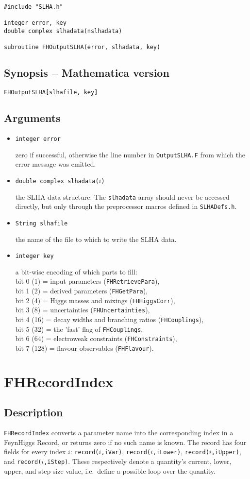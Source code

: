 \documentclass[12pt,a4paper]{report}
\newcommand{\CODE}[1]{\texttt{#1}}
\newcommand{\VARIN}[1]{%
  \item[\fbox{\scriptsize\textsc{in}}]
  \CODE{#1}\par}
\newcommand{\VAROUT}[1]{%
  \item[\fbox{\scriptsize\textsc{out}}]
  \CODE{#1}\par}
\newcommand{\ROUTINE}[1]{\pagebreak
  \section*{#1}%
  \addcontentsline{toc}{section}{#1}}
\newcommand{\DESCRIPTION}{\subsection*{Description}}
\newcommand{\MSYNOPSIS}{\subsection*{Synopsis -- Mathematica version}}
\newcommand{\ARGUMENTS}{\subsection*{Arguments}\begin{itemize}}
\newcommand{\ENDARGUMENTS}{\end{itemize}}
\newcommand\ie{i.e.\ }
\begin{document}
\begin{verbatim}
#include "SLHA.h"

integer error, key
double complex slhadata(nslhadata)

subroutine FHOutputSLHA(error, slhadata, key)
\end{verbatim}

\MSYNOPSIS

\begin{verbatim}
FHOutputSLHA[slhafile, key]
\end{verbatim}

\ARGUMENTS

\VAROUT{integer error}
zero if successful, otherwise the line number in \CODE{OutputSLHA.F} 
from which the error message was emitted.

\VARIN{double complex slhadata($i$)}
the SLHA data structure.  The \CODE{slhadata} array should never be
accessed directly, but only through the preprocessor macros defined in 
\CODE{SLHADefs.h}.

\VARIN{String slhafile}
the name of the file to which to write the SLHA data.

\VARIN{integer key}
a bit-wise encoding of which parts to fill: \\
bit 0 (1) = input parameters (\CODE{FHRetrievePara}), \\
bit 1 (2) = derived parameters (\CODE{FHGetPara}), \\
bit 2 (4) = Higgs masses and mixings (\CODE{FHHiggsCorr}), \\
bit 3 (8) = uncertainties (\CODE{FHUncertainties}), \\
bit 4 (16) = decay widths and branching ratios (\CODE{FHCouplings}), \\
bit 5 (32) = the 'fast' flag of \CODE{FHCouplings}, \\
bit 6 (64) = electroweak constraints (\CODE{FHConstraints}), \\
bit 7 (128) = flavour observables (\CODE{FHFlavour}).

\ENDARGUMENTS


\ROUTINE{FHRecordIndex}

\DESCRIPTION

\CODE{FHRecordIndex} converts a parameter name into the corresponding
index in a FeynHiggs Record, or returns zero if no such name is known. 
The record has four fields for every index $i$: \CODE{record($i$,iVar)},
\CODE{record($i$,iLower)}, \CODE{record($i$,iUpper)}, and
\CODE{record($i$,iStep)}.  These respectively denote a quantity's
current, lower, upper, and step-size value, \ie define a possible loop
over the quantity.
\end{document}

